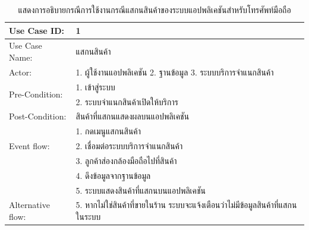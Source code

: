 \begin{table}[htbp]
  \centering
  \caption{แสดงการอธิบายกรณีการใช้งานกรณีแสกนสินค้าของระบบแอปพลิเคชันสำหรับโทรศัพท์มือถือ}
  \label{tab:example}
  \begin{tabularx}{\textwidth}{|p{3cm}|X|}
    \hline
    \multirow{1}{3cm}{Use Case ID:}      & 1                                                             \\
    \hline
    \multirow{1}{3cm}{Use Case Name:}    & แสกนสินค้า                                                      \\
    \hline
    \multirow{1}{3cm}{Actor:}            & 1. ผู้ใช้งานแอปพลิเคชัน 2. ฐานข้อมูล 3. ระบบบริการจำแนกสินค้า            \\
    \hline
    \multirow{2}{3cm}{Pre-Condition:}    & 1. เข้าสู่ระบบ                                                   \\ & 2. ระบบจำแนกสินค้าเปิดให้บริการ\\
    \hline
    \multirow{1}{3cm}{Post-Condition:}   & สินค้าที่แสกนแสดงผลบนแอปพลิเคชัน                                    \\
    \hline
    \multirow{3}{3cm}{Event flow:}       & 1. กดเมนูแสกนสินค้า                                              \\
                                         & 2. เชื่อมต่อระบบบริการจำแนกสินค้า                                    \\ & 3.  ลูกค้าส่องกล้องมือถือไปที่สินค้า \\
                                         & 4. ดึงข้อมูลจากฐานข้อมูล                                           \\
                                         & 5. ระบบแสดงสินค้าที่แสกนบนแอปพลิเคชัน                               \\
    \hline
    \multirow{1}{3cm}{Alternative flow:} & 5. หากไม่ใช่สินค้าที่ขายในร้าน ระบบจะแจ้งเตือนว่าไม่มีข้อมูลสินค้าที่แสกนในระบบ \\
    \hline
  \end{tabularx}
\end{table}

